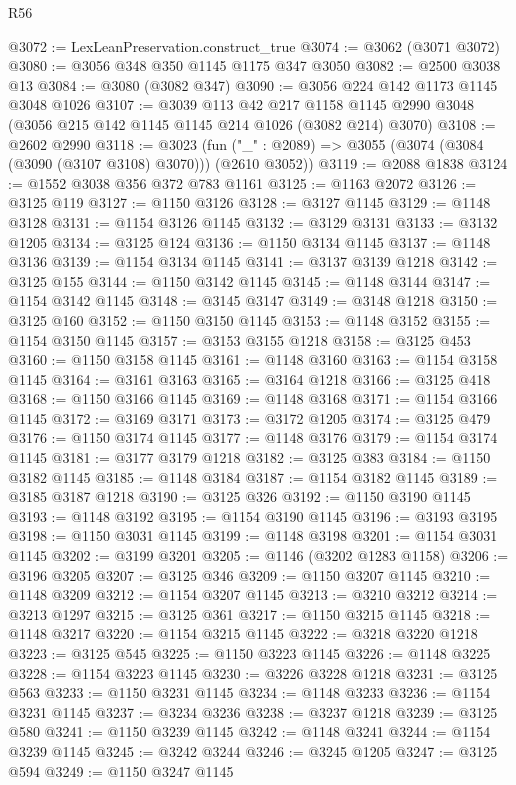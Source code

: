 \begin{lexlean}{R56}
\begin{coremodule}
@3072 := LexLeanPreservation.construct_true
@3074 := @3062 (@3071 @3072)
@3080 := @3056 @348 @350 @1145 @1175 @347 @3050
@3082 := @2500 @3038 @13
@3084 := @3080 (@3082 @347)
@3090 := @3056 @224 @142 @1173 @1145 @3048 @1026
@3107 := @3039
    @113
    @42
    @217
    @1158
    @1145
    @2990
    @3048
    (@3056 @215 @142 @1145 @1145 @214 @1026 (@3082 @214) @3070)
@3108 := @2602 @2990
@3118 := @3023
    (fun ("_" : @2089) => @3055 (@3074 (@3084 (@3090 (@3107 @3108) @3070))) (@2610 @3052))
@3119 := @2088 @1838
@3124 := @1552 @3038 @356 @372 @783 @1161
@3125 := @1163 @2072
@3126 := @3125 @119
@3127 := @1150 @3126
@3128 := @3127 @1145
@3129 := @1148 @3128
@3131 := @1154 @3126 @1145
@3132 := @3129 @3131
@3133 := @3132 @1205
@3134 := @3125 @124
@3136 := @1150 @3134 @1145
@3137 := @1148 @3136
@3139 := @1154 @3134 @1145
@3141 := @3137 @3139 @1218
@3142 := @3125 @155
@3144 := @1150 @3142 @1145
@3145 := @1148 @3144
@3147 := @1154 @3142 @1145
@3148 := @3145 @3147
@3149 := @3148 @1218
@3150 := @3125 @160
@3152 := @1150 @3150 @1145
@3153 := @1148 @3152
@3155 := @1154 @3150 @1145
@3157 := @3153 @3155 @1218
@3158 := @3125 @453
@3160 := @1150 @3158 @1145
@3161 := @1148 @3160
@3163 := @1154 @3158 @1145
@3164 := @3161 @3163
@3165 := @3164 @1218
@3166 := @3125 @418
@3168 := @1150 @3166 @1145
@3169 := @1148 @3168
@3171 := @1154 @3166 @1145
@3172 := @3169 @3171
@3173 := @3172 @1205
@3174 := @3125 @479
@3176 := @1150 @3174 @1145
@3177 := @1148 @3176
@3179 := @1154 @3174 @1145
@3181 := @3177 @3179 @1218
@3182 := @3125 @383
@3184 := @1150 @3182 @1145
@3185 := @1148 @3184
@3187 := @1154 @3182 @1145
@3189 := @3185 @3187 @1218
@3190 := @3125 @326
@3192 := @1150 @3190 @1145
@3193 := @1148 @3192
@3195 := @1154 @3190 @1145
@3196 := @3193 @3195
@3198 := @1150 @3031 @1145
@3199 := @1148 @3198
@3201 := @1154 @3031 @1145
@3202 := @3199 @3201
@3205 := @1146 (@3202 @1283 @1158)
@3206 := @3196 @3205
@3207 := @3125 @346
@3209 := @1150 @3207 @1145
@3210 := @1148 @3209
@3212 := @1154 @3207 @1145
@3213 := @3210 @3212
@3214 := @3213 @1297
@3215 := @3125 @361
@3217 := @1150 @3215 @1145
@3218 := @1148 @3217
@3220 := @1154 @3215 @1145
@3222 := @3218 @3220 @1218
@3223 := @3125 @545
@3225 := @1150 @3223 @1145
@3226 := @1148 @3225
@3228 := @1154 @3223 @1145
@3230 := @3226 @3228 @1218
@3231 := @3125 @563
@3233 := @1150 @3231 @1145
@3234 := @1148 @3233
@3236 := @1154 @3231 @1145
@3237 := @3234 @3236
@3238 := @3237 @1218
@3239 := @3125 @580
@3241 := @1150 @3239 @1145
@3242 := @1148 @3241
@3244 := @1154 @3239 @1145
@3245 := @3242 @3244
@3246 := @3245 @1205
@3247 := @3125 @594
@3249 := @1150 @3247 @1145

\end{coremodule}
\end{lexlean}
